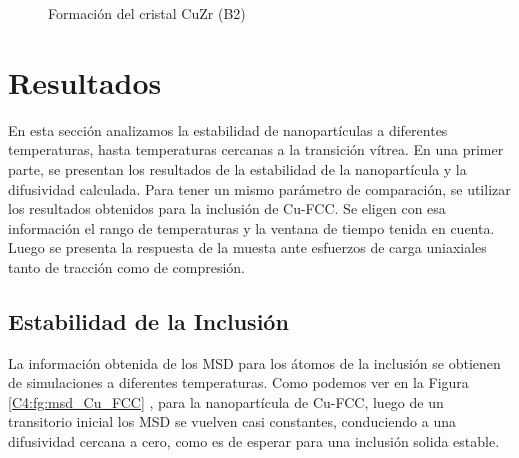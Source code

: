 
\begin{figure}[htp]
\centering
{}
\quad
{}
\caption{Formación del cristal CuZr (B2)}
\label{C4:fg:B2CuZr_Formation}
\end{figure}


\section{Resultados}
\label{S4_3}

En esta sección analizamos la estabilidad de nanopartículas a diferentes temperaturas, hasta temperaturas cercanas a la transición vítrea. En una primer parte, se presentan los resultados de la estabilidad de la nanopartícula y la difusividad calculada. Para tener un mismo parámetro de comparación, se utilizar los resultados obtenidos para la inclusión de Cu-FCC. Se eligen con esa información el rango de temperaturas y la ventana de tiempo tenida en cuenta. Luego se presenta la respuesta de la muesta ante esfuerzos de carga uniaxiales tanto de tracción como de compresión.

\subsection{Estabilidad de la Inclusión}
\label{S4_3_1}

La información obtenida de los MSD para los átomos de la inclusión se obtienen de simulaciones a diferentes temperaturas. Como podemos ver en la Figura \ref{C4:fg:msd_Cu_FCC} , para la nanopartícula de Cu-FCC, luego de un transitorio inicial los MSD se vuelven casi constantes, conduciendo a una difusividad cercana a cero, como es de esperar para una inclusión solida estable.

